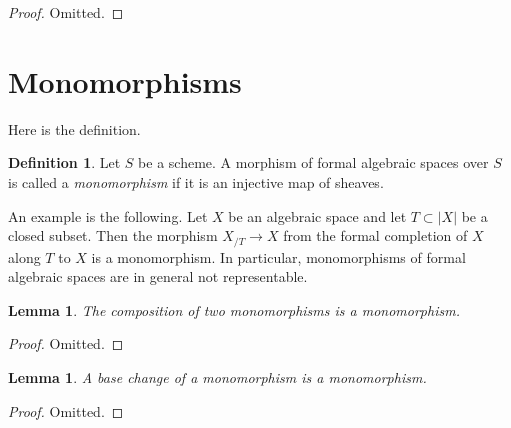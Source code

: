 \documentclass{stacks-project}
\theoremstyle{plain}
\newtheorem{lemma}[subsection]{Lemma}
\theoremstyle{definition}
\newtheorem{definition}[subsection]{Definition}
\theoremstyle{remark}
\numberwithin{equation}{subsection}
\begin{document}
\begin{proof}
Omitted.
\end{proof}







\section{Monomorphisms}
\label{section-monomorphisms}

\noindent
Here is the definition.

\begin{definition}
\label{definition-monomorphism}
Let $S$ be a scheme.
A morphism of formal algebraic spaces over $S$ is called a
{\it monomorphism} if it is an injective map of sheaves.
\end{definition}

\noindent
An example is the following. Let $X$ be an algebraic space and let
$T \subset |X|$ be a closed subset. Then the morphism
$X_{/T} \to X$ from the formal completion of $X$ along $T$ to $X$
is a monomorphism. In particular, monomorphisms of formal algebraic
spaces are in general not representable.

\begin{lemma}
\label{lemma-composition-monomorphism}
The composition of two monomorphisms is a monomorphism.
\end{lemma}

\begin{proof}
Omitted.
\end{proof}

\begin{lemma}
\label{lemma-base-change-monomorphism}
A base change of a monomorphism is a monomorphism.
\end{lemma}

\begin{proof}
Omitted.
\end{proof}
\end{document}
